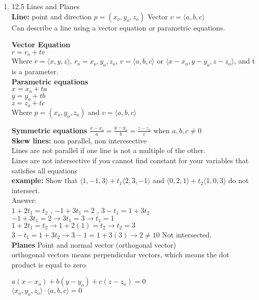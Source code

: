 \documentclass[11pt]{article}
\begin{document}
\begin{enumerate}
\item 12.5 Lines and Planes
\\
\textbf{Line:} point and direction $p=(x_o,y_o,z_o)$ Vector $v= \langle a,b,c \rangle$
\\
Can describe a line using a vector equation or parametric equations.
\\
\begin{center}
\textbf{Vector Equation} 
\\
$r=r_o+tv$ 
\\
Where $r= \langle x,y,z \rangle$, $r_o=x_o,y_o,z_o$, $v= \langle a,b,c \rangle$ or $\langle x-x_o, y-y_o, z-z_o \rangle$, and t is a parameter.
\\
\textbf{Parametric equations}
\\
$x=x_o+ta$
\\
$y=y_o+tb$
\\
$z=z_o+tc$
\\
Where $p=(x_o,y_o,z_o)$ and $v= \langle a,b,c \rangle$

\end{center}

\textbf{Symmetric equations} $\frac{x-x_o}{a}=\frac{y-y_o}{b}=\frac{z-z_o}{c}$ when $a,b,c \ne 0$
\\
\textbf{Skew lines:} non parallel, non interesective
\\
Lines are not parallel if one line  is not a multiple of the other.
\\
Lines are not intersective if you cannot find constant for your variables that satisfies all equations
\\
\textbf{example:} Show that $\langle 1,-1,3 \rangle + t_1\langle 2, 3, -1 \rangle$ and $\langle 0,2,1 \rangle + t_2 \langle 1,0,3 \rangle$ do not intersect.
\\
Answer: 
\\
$1+2t_1=t_2$ , $-1+3t_1=2$ , $3-t_1=1+3t_2$
\\
$-1+3t_1=2 \rightarrow 3t_1=3 \rightarrow t_1=1 $
\\
$1+2t_1=t_2 \rightarrow 1+2(1)=t_2 \rightarrow t_2=3$
\\
$3-t_1=1+3t_2 \rightarrow 3-1=1+3(3) \rightarrow 2 \ne 10$ Not intersected.
\\
\textbf{Planes} Point and normal vector (orthogonal vector)
\\
orthogonal vectors means perpendicular vectors, which means the dot product is equal to zero
\\
\begin{center}
$a(x-x_o)+b(y-y_o)+c(z-z_o)=0$
\\
$\langle x_o,y_o,z_o\rangle \cdot \langle a,b,c \rangle =0$
\\



\end{center}
\end{enumerate}
\end{document}
